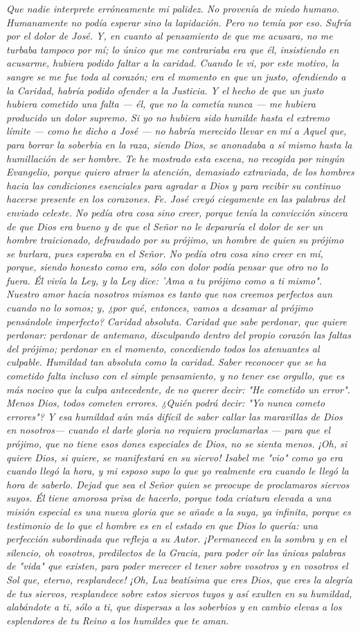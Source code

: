 \documentclass[12pt]{book} %
\begin{document}
\emph{Que nadie interprete erróneamente mi palidez. No provenía de miedo humano. Humanamente no podía esperar sino la lapidación. Pero no temía por eso. Sufría por el dolor de José. Y, en cuanto al pensamiento de que me acusara, no me turbaba tampoco por mí; lo único que me contrariaba era que él, insistiendo en acusarme, hubiera podido faltar a la caridad. Cuando le vi, por este motivo, la sangre se me fue toda al corazón; era el momento en que un justo, ofendiendo a la Caridad, habría podido ofender a la Justicia. Y el hecho de que un justo hubiera cometido una falta — él, que no la cometía nunca — me hubiera producido un dolor supremo. Si yo no hubiera sido humilde hasta el extremo límite — como he dicho a José — no habría merecido llevar en mí a Aquel que, para borrar la soberbia en la raza, siendo Dios, se anonadaba a sí mismo hasta la humillación de ser hombre. Te he mostrado esta escena, no recogida por ningún Evangelio, porque quiero atraer la atención, demasiado extraviada, de los hombres hacia las condiciones esenciales para agradar a Dios y para recibir su continuo hacerse presente en los corazones. Fe. José creyó ciegamente en las palabras del enviado celeste. No pedía otra cosa sino creer, porque tenía la convicción sincera de que Dios era bueno y de que el Señor no le depararía el dolor de ser un hombre traicionado, defraudado por su prójimo, un hombre de quien su prójimo se burlara, pues esperaba en el Señor. No pedía otra cosa sino creer en mí, porque, siendo honesto como era, sólo con dolor podía pensar que otro no lo fuera. Él vivía la Ley, y la Ley dice: 'Ama a tu prójimo como a ti mismo". Nuestro amor hacia nosotros mismos es tanto que nos creemos perfectos aun cuando no lo somos; y, ¿por qué, entonces, vamos a desamar al prójimo pensándole imperfecto? Caridad absoluta. Caridad que sabe perdonar, que quiere perdonar: perdonar de antemano, disculpando dentro del propio corazón las faltas del prójimo; perdonar en el momento, concediendo todos los atenuantes al culpable. Humildad tan absoluta como la caridad. Saber reconocer que se ha cometido falta incluso con el simple pensamiento, y no tener ese orgullo, que es más nocivo que la culpa antecedente, de no querer decir: "He cometido un error". Menos Dios, todos cometen errores. ¿Quién podrá decir: "Yo nunca cometo errores"? Y esa humildad aún más difícil de saber callar las maravillas de Dios en nosotros— cuando el darle gloria no requiera proclamarlas — para que el prójimo, que no tiene esos dones especiales de Dios, no se sienta menos. ¡Oh, si quiere Dios, si quiere, se manifestará en su siervo! Isabel me "vio" como yo era cuando llegó la hora, y mi esposo supo lo que yo realmente era cuando le llegó la hora de saberlo. Dejad que sea el Señor quien se preocupe de proclamaros siervos suyos. Él tiene amorosa prisa de hacerlo, porque toda criatura elevada a una misión especial es una nueva gloria que se añade a la suya, ya infinita, porque es testimonio de lo que el hombre es en el estado en que Dios lo quería: una perfección subordinada que refleja a su Autor. ¡Permaneced en la sombra y en el silencio, oh vosotros, predilectos de la Gracia, para poder oír las únicas palabras de "vida" que existen, para poder merecer el tener sobre vosotros y en vosotros el Sol que, eterno, resplandece! ¡Oh, Luz beatísima que eres Dios, que eres la alegría de tus siervos, resplandece sobre estos siervos tuyos y así exulten en su humildad, alabándote a ti, sólo a ti, que dispersas a los soberbios y en cambio elevas a los esplendores de tu Reino a los humildes que te aman. }

\tableofcontents
\end{document}
